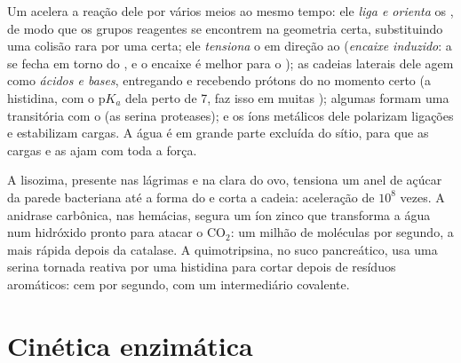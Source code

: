 \begin{proposition}\label{prop:b1:enzymes:mechanisms}
Um  acelera a reação dele por vários meios ao mesmo tempo: ele
\emph{liga e orienta} os , de modo que os grupos reagentes se
encontrem na geometria certa, substituindo uma colisão rara por uma
certa; ele \emph{tensiona} o  em direção ao 
(\emph{encaixe induzido}: a  se fecha em
torno do , e o encaixe é melhor para o ); as
cadeias laterais dele agem como \emph{ácidos e bases}, entregando e
recebendo prótons do  no momento certo (a histidina, com o
p$K_a$ dela perto de 7, faz isso em muitas ); algumas formam uma
\emph{} transitória com o  (as serina
proteases); e os íons metálicos dele polarizam ligações e estabilizam
cargas. A água é em grande parte excluída do sítio, para que as cargas e
as  ajam com toda a força.
\end{proposition}

\begin{example}\label{ex:b1:enzymes:three}
A lisozima, presente nas lágrimas e na clara do ovo, tensiona um anel de
açúcar da parede bacteriana até a forma do  e corta a
cadeia: aceleração de $10^8$ vezes. A anidrase carbônica, nas hemácias,
segura um íon zinco que transforma a água num hidróxido pronto para
atacar o $\mathrm{CO_2}$: um milhão de moléculas por segundo, a 
mais rápida depois da catalase. A quimotripsina, no suco pancreático,
usa uma serina tornada reativa por uma histidina para cortar 
depois de resíduos aromáticos: cem por segundo, com um intermediário
covalente.
\end{example}

\section{Cinética enzimática}

